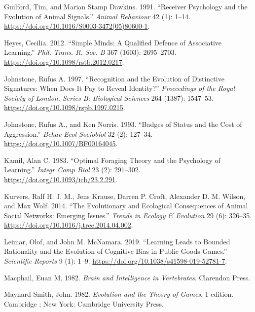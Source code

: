 \documentclass[
  12pt,
]{article}
\newlength{\cslhangindent}
\newlength{\cslentryspacingunit} %
\newenvironment{CSLReferences}[2] %
 {%
  \setlength{\parindent}{0pt}
  \ifodd #1
  \let\oldpar\par
  \def\par{\hangindent=\cslhangindent\oldpar}
  \fi
  \setlength{\parskip}{#2\cslentryspacingunit}
 }%
 {}
\begin{document}
\begin{CSLReferences}{1}{0}
\leavevmode{}%
Guilford, Tim, and Marian Stamp Dawkins. 1991. {``Receiver Psychology
and the Evolution of Animal Signals.''} \emph{Animal Behaviour} 42 (1):
1--14. \url{https://doi.org/10.1016/S0003-3472(05)80600-1}.

\leavevmode{}%
Heyes, Cecilia. 2012. {``Simple Minds: A Qualified Defence of
Associative Learning.''} \emph{Phil. Trans. R. Soc. B} 367 (1603):
2695--2703. \url{https://doi.org/10.1098/rstb.2012.0217}.

\leavevmode{}%
Johnstone, Rufus A. 1997. {``Recognition and the Evolution of
Distinctive Signatures: When Does It Pay to Reveal Identity?''}
\emph{Proceedings of the Royal Society of London. Series B: Biological
Sciences} 264 (1387): 1547--53.
\url{https://doi.org/10.1098/rspb.1997.0215}.

\leavevmode{}%
Johnstone, Rufus A., and Ken Norris. 1993. {``Badges of Status and the
Cost of Aggression.''} \emph{Behav Ecol Sociobiol} 32 (2): 127--34.
\url{https://doi.org/10.1007/BF00164045}.

\leavevmode{}%
Kamil, Alan C. 1983. {``Optimal {Foraging Theory} and the {Psychology}
of {Learning}.''} \emph{Integr Comp Biol} 23 (2): 291--302.
\url{https://doi.org/10.1093/icb/23.2.291}.

\leavevmode{}%
Kurvers, Ralf H. J. M., Jens Krause, Darren P. Croft, Alexander D. M.
Wilson, and Max Wolf. 2014. {``The Evolutionary and Ecological
Consequences of Animal Social Networks: Emerging Issues.''} \emph{Trends
in Ecology \& Evolution} 29 (6): 326--35.
\url{https://doi.org/10.1016/j.tree.2014.04.002}.

\leavevmode{}%
Leimar, Olof, and John M. McNamara. 2019. {``Learning Leads to Bounded
Rationality and the Evolution of Cognitive Bias in Public Goods
Games.''} \emph{Scientific Reports} 9 (1): 1--9.
\url{https://doi.org/10.1038/s41598-019-52781-7}.

\leavevmode{}%
Macphail, Euan M. 1982. \emph{Brain and {Intelligence} in
{Vertebrates}}. {Clarendon Press}.

\leavevmode{}%
Maynard-Smith, John. 1982. \emph{Evolution and the {Theory} of {Games}}.
1 edition. {Cambridge ; New York}: {Cambridge University Press}.


\end{CSLReferences}
\end{document}
